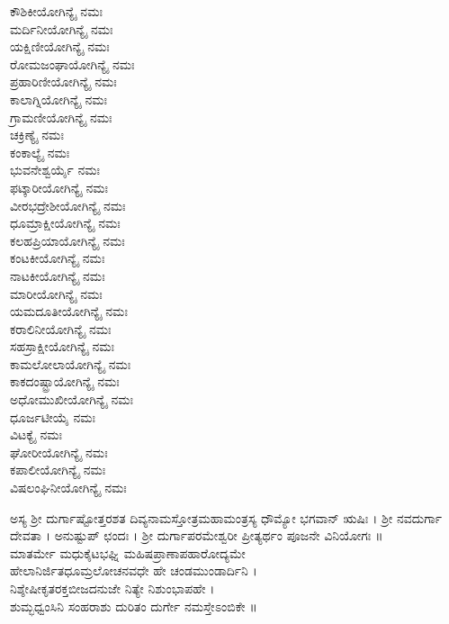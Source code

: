 \begin{multicols}{2}
ಕೌಶಿಕೀಯೋಗಿನ್ಯೈ ನಮಃ\\
ಮರ್ದಿನೀಯೋಗಿನ್ಯೈ ನಮಃ\\
ಯಕ್ಷಿಣೀಯೋಗಿನ್ಯೈ ನಮಃ\\
ರೋಮಜಂಘಾಯೋಗಿನ್ಯೈ ನಮಃ\\
ಪ್ರಹಾರಿಣೀಯೋಗಿನ್ಯೈ ನಮಃ\\
ಕಾಲಾಗ್ನಿಯೋಗಿನ್ಯೈ ನಮಃ\\
ಗ್ರಾಮಣೀಯೋಗಿನ್ಯೈ ನಮಃ\\
ಚಕ್ರಿಣ್ಯೈ ನಮಃ\\
ಕಂಕಾಲ್ಯೈ ನಮಃ\\
ಭುವನೇಶ್ವರ್ಯೈ ನಮಃ\\
ಫಟ್ಕಾರೀಯೋಗಿನ್ಯೈ ನಮಃ\\
ವೀರಭದ್ರೇಶೀಯೋಗಿನ್ಯೈ ನಮಃ\\
ಧೂಮ್ರಾಕ್ಷೀಯೋಗಿನ್ಯೈ ನಮಃ\\
ಕಲಹಪ್ರಿಯಾಯೋಗಿನ್ಯೈ ನಮಃ\\
ಕಂಟಕೀಯೋಗಿನ್ಯೈ ನಮಃ\\
ನಾಟಕೀಯೋಗಿನ್ಯೈ ನಮಃ\\
ಮಾರೀಯೋಗಿನ್ಯೈ ನಮಃ\\
ಯಮದೂತೀಯೋಗಿನ್ಯೈ ನಮಃ\\
ಕರಾಲಿನೀಯೋಗಿನ್ಯೈ ನಮಃ\\
ಸಹಸ್ರಾಕ್ಷೀಯೋಗಿನ್ಯೈ ನಮಃ\\
ಕಾಮಲೋಲಾಯೋಗಿನ್ಯೈ ನಮಃ\\
ಕಾಕದಂಷ್ಟ್ರಾಯೋಗಿನ್ಯೈ ನಮಃ\\
ಅಧೋಮುಖೀಯೋಗಿನ್ಯೈ ನಮಃ\\
ಧೂರ್ಜಟೀಯೈ ನಮಃ\\
ವಿಟಕ್ಯೈ ನಮಃ\\
ಘೋರೀಯೋಗಿನ್ಯೈ ನಮಃ\\
ಕಪಾಲೀಯೋಗಿನ್ಯೈ ನಮಃ\\
ವಿಷಲಂಘಿನೀಯೋಗಿನ್ಯೈ ನಮಃ
\end{multicols}
ಅಸ್ಯ ಶ್ರೀ ದುರ್ಗಾಷ್ಟೋತ್ತರಶತ ದಿವ್ಯನಾಮಸ್ತೋತ್ರಮಹಾಮಂತ್ರಸ್ಯ ಧೌಮ್ಯೋ ಭಗವಾನ್ ಋಷಿಃ । ಶ್ರೀ ನವದುರ್ಗಾ ದೇವತಾ । ಅನುಷ್ಟುಪ್ ಛಂದಃ । ಶ್ರೀ ದುರ್ಗಾಪರಮೇಶ್ವರೀ ಪ್ರೀತ್ಯರ್ಥಂ ಪೂಜನೇ ವಿನಿಯೋಗಃ ॥\\
ಮಾತರ್ಮೇ ಮಧುಕೈಟಭಘ್ನಿ ಮಹಿಷಪ್ರಾಣಾಪಹಾರೋದ್ಯಮೇ \\
ಹೇಲಾನಿರ್ಜಿತಧೂಮ್ರಲೋಚನವಧೇ ಹೇ ಚಂಡಮುಂಡಾರ್ದಿನಿ ।\\
ನಿಶ್ಶೇಷೀಕೃತರಕ್ತಬೀಜದನುಜೇ ನಿತ್ಯೇ ನಿಶುಂಭಾಪಹೇ ।\\
ಶುಮ್ಭಧ್ವಂಸಿನಿ ಸಂಹರಾಶು ದುರಿತಂ ದುರ್ಗೇ ನಮಸ್ತೇಽಂಬಿಕೇ ॥
